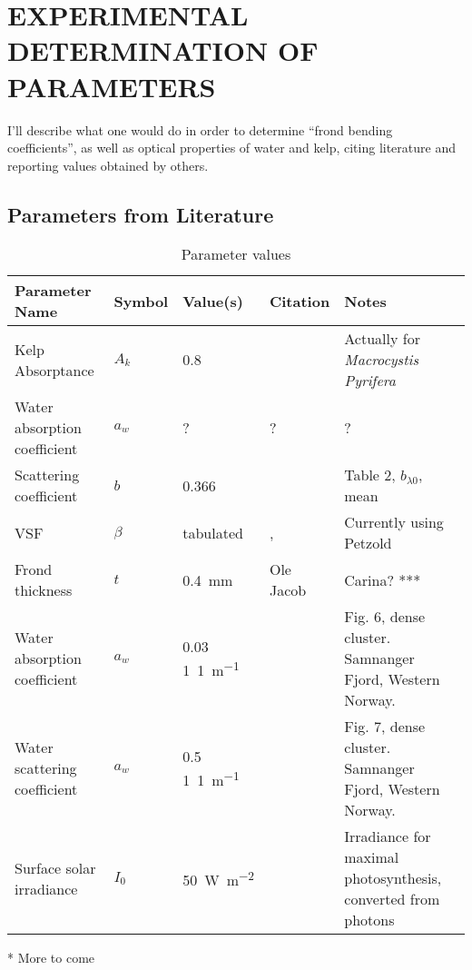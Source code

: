 \chapter{EXPERIMENTAL DETERMINATION OF PARAMETERS} \label{ch:experiment}

I'll describe what one would do in order to determine
``frond bending coefficients'', as well as optical properties of water and kelp,
citing literature and reporting values obtained by others.

\section{Parameters from Literature}
\begin{table}
  \centering
  \begin{tabular}{p{} p{} p{} p{} p{}}
    \toprule
    Parameter Name & Symbol & Value(s) & Citation & Notes \\
    \midrule
    Kelp Absorptance & $A_k$ & 0.8 & \cite{colombo-pallotta_photosynthetic_2006} & Actually for \textit{Macrocystis Pyrifera}\\
    Water absorption coefficient & $a_w$ & ? & ? & ? \\
    Scattering coefficient & $b$ & 0.366 & \cite{sokolov_parameterization_2010} & Table 2, $b_{\lambda 0}$, mean \\
    VSF & $\beta$ & tabulated & \cite{petzold_volume_1972,sokolov_parameterization_2010}, & Currently using Petzold \\ 
    Frond thickness & $t$ & \SI{0.4}{\mm} & Ole Jacob & Carina?  *** \\
    Water absorption coefficient & $a_w$ & 0.03 \SI{1}{1\per\m} & \cite{hamre_parameterization_2003} & Fig. 6, dense cluster. Samnanger Fjord, Western Norway. \\
    Water scattering coefficient & $a_w$ & 0.5 \SI{1}{1\per\m} & \cite{hamre_parameterization_2003} & Fig. 7, dense cluster. Samnanger Fjord, Western Norway. \\
    Surface solar irradiance & $I_0$ & \SI{50}{\W\per\m\squared} & \cite{broch_modelling_2012} & Irradiance for maximal photosynthesis, converted from photons \\
    \bottomrule
  \end{tabular}
  \caption{Parameter values}
\end{table}

* More to come


